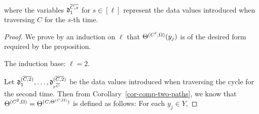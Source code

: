 \begin{appendix}
{\noindent
\medskip
{}
\medskip\\
where the variables $\mathfrak{d}^{\overline{C , s}}_{1}$ for $s\in [\ell]$
 represent the data values introduced when traversing $C$ for the $s$-th time. 
}

%
\begin{proof}
We prove by an induction on $\ell$ that $\Theta^{(C^\ell,\Omega)}(y_j)$ is of the desired form required by the proposition.

\noindent The induction base: $\ell=2$.

\smallskip

Let $\mathfrak{d}^{(\overline{C, 2})}_{1}, \dots, \mathfrak{d}^{(\overline{C, 2})}_{r^{\overline{C}}}$ be the data values introduced when traversing the cycle for the second time. Then from Corollary~\ref{cor-comp-two-paths}, we know that $\Theta^{(C^{2},\Omega)} = \Theta^{(C,\Theta^{(C,\Omega)})}$ is defined as follows: For each $y_j \in Y$,


\end{proof}
\end{appendix}
